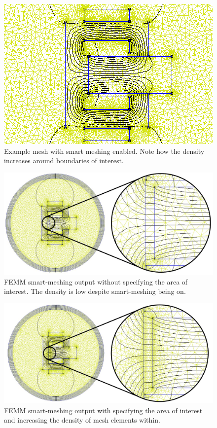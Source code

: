 \documentclass[a4paper]{IEEEtran}
\begin{document}
\begin{figure}[ht]
\includegraphics[width = \linewidth]{Smartmesh-ON-NotDenseAirgap.png}
\caption{Example mesh with smart meshing enabled. Note how the density increases around boundaries of interest.}
\label{smartMesh} 
\end{figure}

\begin{figure}[ht]
\includegraphics[width = \linewidth]{figurezoomnotdense.jpg}
\caption{FEMM smart-meshing output without specifying the area of interest. The density is low despite smart-meshing being on.}
\label{zoomNotDense} 
\end{figure}

\begin{figure}[ht]
\includegraphics[width = \linewidth]{figurezoomdense.jpg}
\caption{FEMM smart-meshing output with specifying the area of interest and increasing the density of mesh elements within.}
\label{zoomDense} 
\end{figure}
\end{document}
